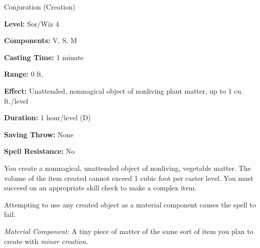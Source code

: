 
Conjuration (Creation)

\textbf{Level:} Sor/Wiz 4

\textbf{Components:} V, S, M

\textbf{Casting Time:} 1 minute

\textbf{Range:} 0 ft.

\textbf{Effect:} Unattended, nonmagical object of nonliving plant matter, up to 
1 cu. ft./level

\textbf{Duration:} 1 hour/level (D)

\textbf{Saving Throw:} None

\textbf{Spell Resistance:} No

You create a nonmagical, unattended object of nonliving, vegetable matter. The 
volume of the item created cannot exceed 1 cubic foot per caster level. You must 
succeed on an appropriate skill check to make a complex item.

Attempting to use any created object as a material component causes the spell to 
fail.

\textit{Material Component:} A tiny piece of matter of the same sort of item you 
plan to create with \textit{minor creation}.

